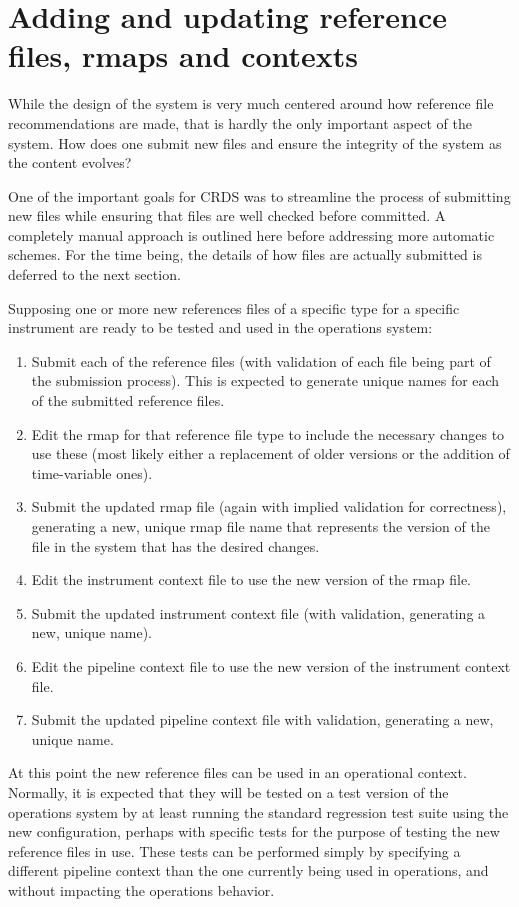 \documentclass[final,authoryear,5p,times,twocolumn]{elsarticle}
\begin{document}
\section{Adding and updating reference files, rmaps and contexts}

While the design of the system is very much centered around how reference file
recommendations are made, that is hardly the only important aspect of the
system. How does one submit new files and ensure the integrity of the system as
the content evolves?

One of the important goals for CRDS was to streamline the process of submitting
new files while ensuring that files are well checked before committed.
A completely manual approach is
outlined here before addressing more automatic schemes. For the time being, the
details of how files are actually submitted is deferred to the next section.

Supposing one or more new references files of a specific type for a specific
instrument are ready to be tested and used in the operations system:

\begin{enumerate}
\item Submit each of the reference files (with validation of each file
being part of the submission process). This is expected to generate
unique names for each of the submitted reference files.
\item Edit the rmap for that reference file type to include the necessary
changes to use these (most likely either a replacement of older versions
or the addition of time-variable ones).
\item Submit the updated rmap file (again with implied validation for
correctness), generating a new, unique rmap file name that represents the version
of the file in the system that has the desired changes.
\item Edit the instrument context file to use the new version of the rmap file.
\item Submit the updated instrument context file (with validation,
generating a new, unique name).
\item Edit the pipeline context file to use the new version of the
instrument context file.
\item Submit the updated pipeline context file with validation, 
generating a new, unique name.
\end{enumerate}

At this point the new reference files can be used in an operational
context. Normally, it is expected that they will be tested on a test version of
the operations system by at least running the standard regression test suite
using the new configuration, perhaps with specific tests for the purpose of
testing the new reference files in use. These tests can be performed simply by
specifying a different pipeline context than the one currently being used in
operations, and without impacting the operations behavior.
\end{document}
